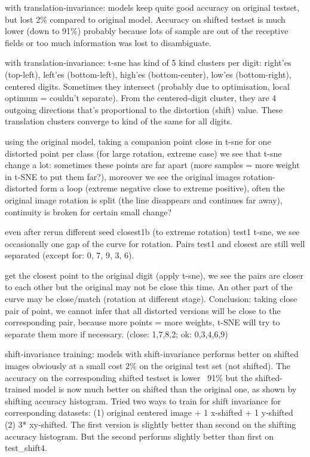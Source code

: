 \documentclass[a4paper,12pt]{article}
\begin{document}
with translation-invariance: models keep quite good accuracy on original testset, but lost 2\% compared to original model. Accuracy on shifted testset is much lower (down to 91\%) probably because lots of sample are out of the receptive fields or too much information was lost to disambiguate.

with translation-invariance: t-sne has kind of 5 kind clusters per digit: right'es (top-left), left'es (bottom-left), high'es (bottom-center), low'es (bottom-right), centered digits. Sometimes they intersect (probably due to optimisation, local optimum = couldn't separate). From the centered-digit cluster, they are 4 outgoing directions that's proportional to the distortion (shift) value. These translation clusters converge to kind of the same for all digits.

using the original model, taking a companion point close in t-sne for one distorted point per class (for large rotation, extreme case) we see that t-sne change a lot: sometimes these points are far apart (more samples = more weight in t-SNE to put them far?), moreover we see the original images rotation-distorted form a loop (extreme negative close to extreme positive), often the original image rotation is split (the line disappears and continues far away), continuity is broken for certain small change?

even after rerun different seed closest1b (to extreme rotation) test1 t-sne, we see occasionally one gap of the curve for rotation. Pairs test1 and closest are still well separated (except for: 0, 7, 9, 3, 6).

get the closest point to the original digit (apply t-sne), we see the pairs are closer to each other but the original may not be close this time. An other part of the curve may be close/match (rotation at different stage). Conclusion: taking close pair of point, we cannot infer that all distorted versions will be close to the corresponding pair, because more points = more weights, t-SNE will try to separate them more if necessary. (close: 1,7,8,2; ok: 0,3,4,6,9)

shift-invariance training: models with shift-invariance performs better on shifted images obviously at a small cost 2\% on the original test set (not shifted). The accuracy on the corresponding shifted testset is lower ~91\% but the shifted-trained model is now much better on shifted than the original one, as shown by shifting accuracy histogram. Tried two ways to train for shift invariance for corresponding datasets: (1) original centered image + 1 x-shifted + 1 y-shifted (2) 3* xy-shifted. The first version is slightly better than second on the shifting accuracy histogram. But the second performs slightly better than first on test\_shift4.
\end{document}
